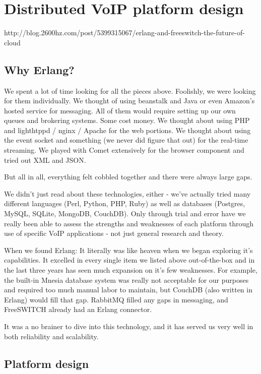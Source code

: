 \chapter{Distributed VoIP platform design}
\label{ch:platform}
http://blog.2600hz.com/post/5399315067/erlang-and-freeswitch-the-future-of-cloud

\section{Why Erlang?}
We spent a lot of time looking for all the pieces above. Foolishly, we were looking for them individually. We thought of using beanstalk and Java or even Amazon’s hosted service for messaging. All of them would require setting up our own queues and brokering systems. Some cost money. We thought about using PHP and lighthtppd / nginx / Apache for the web portions. We thought about using the event socket and something (we never did figure that out) for the real-time streaming. We played with Comet extensively for the browser component and tried out XML and JSON.

But all in all, everything felt cobbled together and there were always large gaps.

We didn’t just read about these technologies, either - we’ve actually tried many different languages (Perl, Python, PHP, Ruby) as well as databases (Postgres, MySQL, SQLite, MongoDB, CouchDB). Only through trial and error have we really been able to assess the strengths and weaknesses of each platform through use of specific VoIP applications - not just general research and theory.

When we found Erlang: It literally was like heaven when we began exploring it’s capabilities. It excelled in every single item we listed above out-of-the-box and in the last three years has seen much expansion on it’s few weaknesses. For example, the built-in Mnesia database system was really not acceptable for our purposes and required too much manual labor to maintain, but CouchDB (also written in Erlang) would fill that gap. RabbitMQ filled any gaps in messaging, and FreeSWITCH already had an Erlang connector. 

It was a no brainer to dive into this technology, and it has served us very well in both reliability and scalability.

\section{Platform design}

